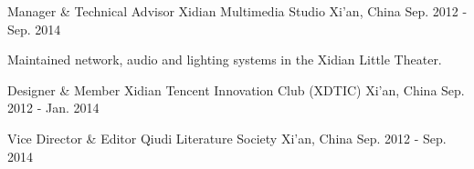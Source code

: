 

\begin{cventries}

  \cventry
    {Manager \& Technical Advisor} %
    {Xidian Multimedia Studio} %
    {Xi'an, China} %
    {Sep. 2012 - Sep. 2014} %
    {
      \begin{cvitems} %
        \item {Maintained network, audio and lighting systems in the Xidian Little Theater.}
      \end{cvitems}
    }

  \cventrys
    {Designer \& Member} %
    {Xidian Tencent Innovation Club (XDTIC)} %
    {Xi'an, China} %
    {Sep. 2012 - Jan. 2014} %

  \hfill
  \cventrys
    {Vice Director \& Editor} %
    {Qiudi Literature Society} %
    {Xi'an, China} %
    {Sep. 2012 - Sep. 2014} %

\end{cventries}
